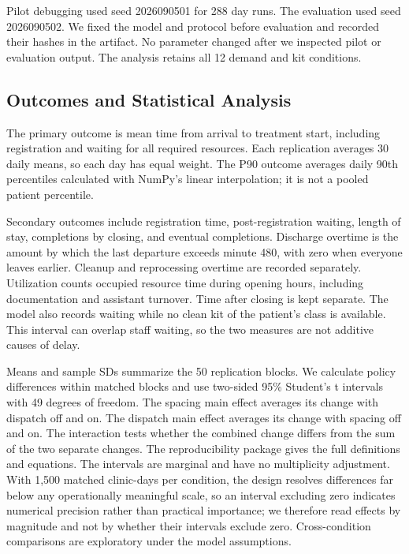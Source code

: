 \documentclass[conference]{IEEEtran}
\begin{document}
Pilot debugging used seed 2026090501 for 288 day runs. The evaluation used seed 2026090502. We fixed the model and protocol before evaluation and recorded their hashes in the artifact. No parameter changed after we inspected pilot or evaluation output. The analysis retains all 12 demand and kit conditions.

\subsection{Outcomes and Statistical Analysis}\label{subsec:outcomes}
The primary outcome is mean time from arrival to treatment start, including registration and waiting for all required resources. Each replication averages 30 daily means, so each day has equal weight. The P90 outcome averages daily 90th percentiles calculated with NumPy's linear interpolation; it is not a pooled patient percentile.

Secondary outcomes include registration time, post-registration waiting, length of stay, completions by closing, and eventual completions. Discharge overtime is the amount by which the last departure exceeds minute 480, with zero when everyone leaves earlier. Cleanup and reprocessing overtime are recorded separately. Utilization counts occupied resource time during opening hours, including documentation and assistant turnover. Time after closing is kept separate. The model also records waiting while no clean kit of the patient's class is available. This interval can overlap staff waiting, so the two measures are not additive causes of delay.

Means and sample SDs summarize the 50 replication blocks. We calculate policy differences within matched blocks and use two-sided 95\% Student's t intervals with 49 degrees of freedom. The spacing main effect averages its change with dispatch off and on. The dispatch main effect averages its change with spacing off and on. The interaction tests whether the combined change differs from the sum of the two separate changes. The reproducibility package gives the full definitions and equations. The intervals are marginal and have no multiplicity adjustment. With 1,500 matched clinic-days per condition, the design resolves differences far below any operationally meaningful scale, so an interval excluding zero indicates numerical precision rather than practical importance; we therefore read effects by magnitude and not by whether their intervals exclude zero. Cross-condition comparisons are exploratory under the model assumptions.
\end{document}
